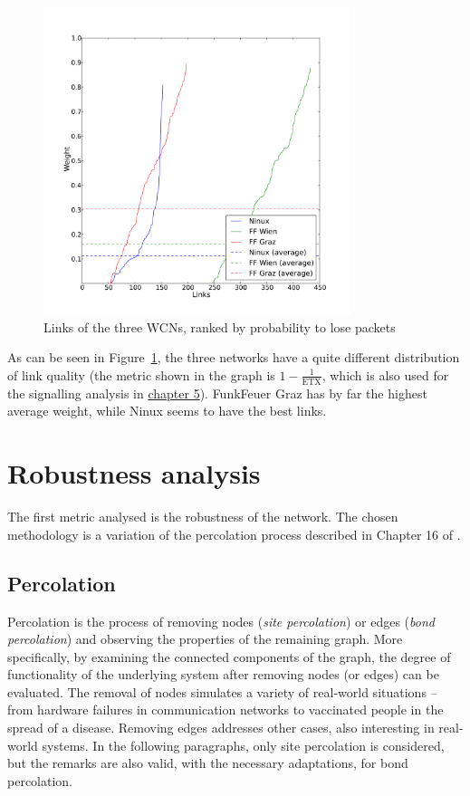 \documentclass[a4paper,11pt,twoside,openright]{memoir}
\newcommand{\figref}[1] {Figure~\ref{#1}}
\newcommand{\etx}{\mathrm{ETX}}
\begin{document}
\begin{figure}[htb]
\centering
\includegraphics[width=0.8\textwidth]{graphs/weight_rank.pdf}
\caption{Links of the three WCNs, ranked by probability to lose packets}
\label{fig:wcn-link-ranking}
\end{figure}

As can be seen in \figref{fig:wcn-link-ranking}, the three networks have a quite
different distribution of link quality (the metric shown in the graph is
$1 - \frac{1}{\etx}$, which is also used for the signalling analysis in
\hyperref[message-propagation-analysis]{chapter 5}). FunkFeuer Graz has by far the highest average
weight, while Ninux seems to have the best links.

\chapter{Robustness analysis}\label{robustness-analysis}

The first metric analysed is the robustness of the network. The chosen
methodology is a variation of the percolation process described in
Chapter 16 of \cite{newman_networks:_2010}.

\section{Percolation}\label{percolation}

Percolation is the process of removing nodes (\emph{site percolation})
or edges (\emph{bond percolation}) and observing the properties of the
remaining graph. More specifically, by examining the connected
components of the graph, the degree of functionality of the underlying system 
after removing nodes (or edges) can be evaluated. The removal
of nodes simulates a variety of real-world situations -- from hardware
failures in communication networks to vaccinated people in the spread
of a disease. Removing edges addresses other cases, also interesting in
real-world systems. In the following paragraphs, only site percolation
is considered, but the remarks are also valid, with the necessary
adaptations, for bond percolation.
\end{document}
